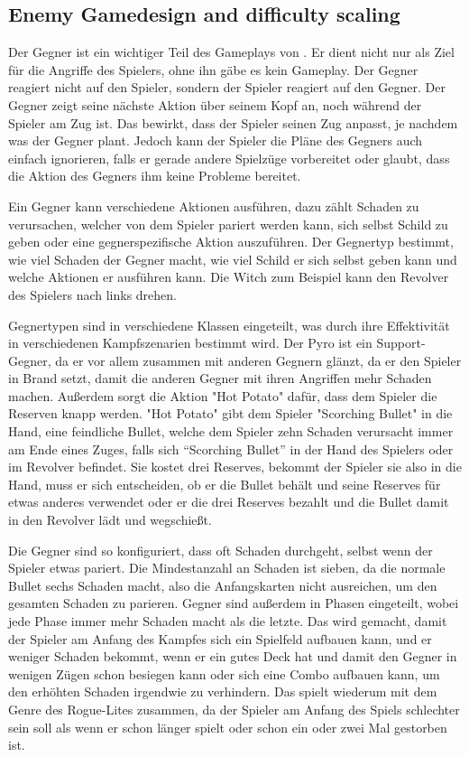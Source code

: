 \subsection{Enemy Gamedesign and difficulty scaling}\label{subsec:placementMatters}

Der Gegner ist ein wichtiger Teil des Gameplays von \FF. Er dient nicht nur als Ziel für die Angriffe des Spielers, ohne ihn gäbe es kein Gameplay.
Der Gegner reagiert nicht auf den Spieler, sondern der Spieler reagiert auf den Gegner. Der Gegner zeigt seine nächste Aktion über seinem Kopf an, noch während der Spieler am Zug ist.
Das bewirkt, dass der Spieler seinen Zug anpasst, je nachdem was der Gegner plant. Jedoch kann der Spieler die Pläne des Gegners auch einfach ignorieren,
falls er gerade andere Spielzüge vorbereitet oder glaubt, dass die Aktion des Gegners ihm keine Probleme bereitet.


Ein Gegner kann verschiedene Aktionen ausführen, dazu zählt Schaden zu verursachen, welcher von dem Spieler pariert
werden kann, sich selbst Schild zu geben oder eine gegnerspezifische Aktion auszuführen. Der Gegnertyp bestimmt,
wie viel Schaden der Gegner macht, wie viel Schild er sich selbst geben kann und welche Aktionen er ausführen kann.
Die Witch zum Beispiel kann den Revolver des Spielers nach links drehen.


Gegnertypen sind in verschiedene Klassen eingeteilt,
was durch ihre Effektivität in verschiedenen Kampfszenarien bestimmt wird. Der Pyro ist ein Support-Gegner, da er vor
allem zusammen mit anderen Gegnern glänzt, da er den Spieler in Brand setzt, damit die anderen Gegner mit ihren Angriffen
mehr Schaden machen. Außerdem sorgt die Aktion "Hot Potato" dafür, dass dem Spieler die Reserven knapp werden. "Hot Potato"
gibt dem Spieler "Scorching Bullet" in die Hand, eine feindliche Bullet, welche dem Spieler zehn Schaden verursacht immer am
Ende eines Zuges, falls sich “Scorching Bullet” in der Hand des Spielers oder im Revolver befindet. Sie kostet drei Reserves,
bekommt der Spieler sie also in die Hand, muss er sich entscheiden, ob er die Bullet behält und seine Reserves für etwas anderes
verwendet oder er die drei Reserves bezahlt und die Bullet damit in den Revolver lädt und wegschießt.


Die Gegner sind so konfiguriert, dass oft Schaden durchgeht, selbst wenn der Spieler etwas pariert. Die Mindestanzahl
an Schaden ist sieben, da die normale Bullet sechs Schaden macht, also die Anfangskarten nicht ausreichen, um den gesamten
Schaden zu parieren. Gegner sind außerdem in Phasen eingeteilt, wobei jede Phase immer mehr Schaden macht als die letzte.
Das wird gemacht, damit der Spieler am Anfang des Kampfes sich ein Spielfeld aufbauen kann, und er weniger Schaden bekommt,
wenn er ein gutes Deck hat und damit den Gegner in wenigen Zügen schon besiegen kann oder sich eine Combo aufbauen kann,
um den erhöhten Schaden irgendwie zu verhindern. Das spielt wiederum mit dem Genre des Rogue-Lites zusammen,
da der Spieler am Anfang des Spiels schlechter sein soll als wenn er schon länger spielt oder schon ein oder zwei Mal gestorben ist.


